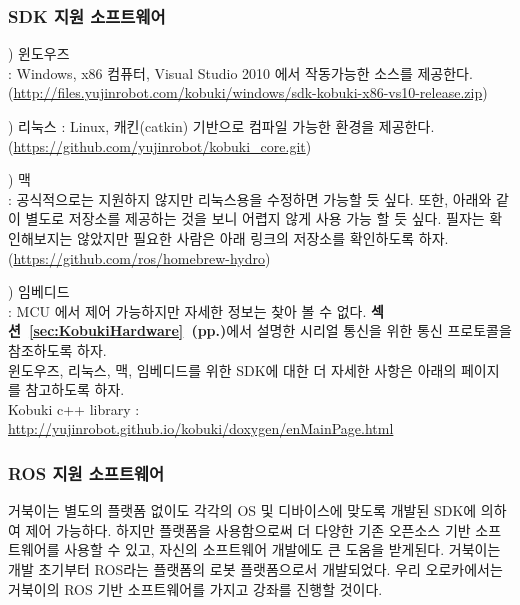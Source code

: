 \subsubsection{SDK 지원 소프트웨어}

\setcounter{num}{0}

\vspace{\baselineskip}
\noindent
{}
) 윈도우즈\\
: Windows, x86 컴퓨터, Visual Studio 2010 에서 작동가능한 소스를 제공한다.\\  
(\url{http://files.yujinrobot.com/kobuki/windows/sdk-kobuki-x86-vs10-release.zip})

\vspace{\baselineskip}
\noindent
{}
) 리눅스 
: Linux, 캐킨(catkin) 기반으로 컴파일 가능한 환경을 제공한다.\\
(\url{https://github.com/yujinrobot/kobuki_core.git})

\vspace{\baselineskip}
\noindent
{}
) 맥\\
: 공식적으로는 지원하지 않지만 리눅스용을 수정하면 가능할 듯 싶다. 또한, 아래와 같이 별도로 저장소를 제공하는 것을 보니 어렵지 않게 사용 가능 할 듯 싶다. 필자는 확인해보지는 않았지만 필요한 사람은 아래 링크의 저장소를 확인하도록 하자.\\
(\url{https://github.com/ros/homebrew-hydro})

\vspace{\baselineskip}
\noindent
{}
) 임베디드\\
: MCU 에서 제어 가능하지만 자세한 정보는 찾아 볼 수 없다. \textbf{섹션~\ref{sec:KobukiHardware}~(pp.\pageref{sec:KobukiHardware})}에서 설명한 시리얼 통신을 위한 통신 프로토콜을 참조하도록 하자.\\

윈도우즈, 리눅스, 맥, 임베디드를 위한 SDK에 대한 더 자세한 사항은 아래의 페이지를 참고하도록 하자.\\
Kobuki c++ library : \url{http://yujinrobot.github.io/kobuki/doxygen/enMainPage.html}

\subsubsection{ROS 지원 소프트웨어}

거북이는 별도의 플랫폼 없이도 각각의 OS 및 디바이스에 맞도록 개발된 SDK에 의하여 제어 가능하다. 하지만 플랫폼을 사용함으로써 더 다양한 기존 오픈소스 기반 소프트웨어를 사용할 수 있고, 자신의 소프트웨어 개발에도 큰 도움을 받게된다. 거북이는 개발 초기부터 ROS라는 플랫폼의 로봇 플랫폼으로서 개발되었다. 우리 오로카에서는 거북이의 ROS 기반 소프트웨어를 가지고 강좌를 진행할 것이다.
 
